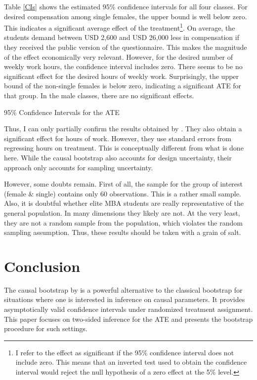 \documentclass[aodsor,preprint]{imsart}
\numberwithin{equation}{section}
\theoremstyle{plain}
\begin{document}
Table \ref{CIs} shows the estimated 95\% confidence intervals for all four classes. For desired compensation among single females, the upper bound is well below zero. This indicates a significant average effect of the treatment\footnote{I refer to the effect as significant if the 95\% confidence interval does not include zero. This means that an inverted test used to obtain the confidence interval would reject the null hypothesis of a zero effect at the 5\% level.}. On average, the students demand between USD 2,600 and USD 26,000 less in compensation if they received the public version of the questionnaire. This makes the magnitude of the effect economically very relevant. However, for the desired number of weekly work hours, the confidence interval includes zero. There seems to be no significant effect for the desired hours of weekly work. Surprisingly, the upper bound of the non-single females is below zero, indicating a significant ATE for that group. In the male classes, there are no significant effects.

\begin{table}[!h]
	\centering
	\caption{95\% Confidence Intervals for the ATE}
	\label{CIs}
	
\end{table}

Thus, I can only partially confirm the results obtained by \cite{Bursztyn_2017}. They also obtain a significant effect for hours of work. However, they use standard errors from regressing hours on treatment. This is conceptually different from what is done here. While the causal bootstrap also accounts for design uncertainty, their approach only accounts for sampling uncertainty.

However, some doubts remain. First of all, the sample for the group of interest (female \& single) contains only 60 observations. This is a rather small sample. Also, it is doubtful whether elite MBA students are really representative of the general population. In many dimensions they likely are not. At the very least, they are not a random sample from the population, which violates the random sampling assumption. Thus, these results should be taken with a grain of salt. 



\section{Conclusion} \label{Conclusion}

The causal bootstrap by \cite{Imbens_2021} is a powerful alternative to the classical bootstrap for situations where one is interested in inference on causal parameters. It provides asymptotically valid confidence intervals under randomized treatment assignment. This paper focuses on two-sided inference for the ATE and presents the bootstrap procedure for such settings.
\end{document}
